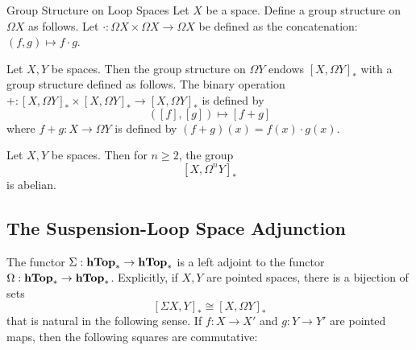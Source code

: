 \documentclass[a4paper]{article}
\begin{document}
\begin{defn}{Group Structure on Loop Spaces}{} Let $X$ be a space. Define a group structure on $\Omega X$ as follows. Let $\cdot:\Omega X\times\Omega X\to\Omega X$ be defined as the concatenation: $(f,g)\mapsto f\cdot g$. 
\end{defn}

\begin{prp}{}{} Let $X,Y$ be spaces. Then the group structure on $\Omega Y$ endows $[X,\Omega Y]_\ast$ with a group structure defined as follows. The binary operation $+:[X,\Omega Y]_\ast\times[X,\Omega Y]_\ast\to[X,\Omega Y]_\ast$ is defined by $$([f],[g])\mapsto[f+g]$$ where $f+g:X\to\Omega Y$ is defined by $(f+g)(x)=f(x)\cdot g(x)$. 
\end{prp}

\begin{prp}{}{} Let $X,Y$ be spaces. Then for $n\geq 2$, the group $$[X,\Omega^n Y]_\ast$$ is abelian. 
\end{prp}

\subsection{The Suspension-Loop Space Adjunction}
\begin{thm}{}{} The functor $\Sigma:\bold{hTop}_\ast\to\bold{hTop}_\ast$ is a left adjoint to the functor $\Omega:\bold{hTop}_\ast\to\bold{hTop}_\ast$. Explicitly, if $X,Y$ are pointed spaces, there is a bijection of sets $$[\Sigma X,Y]_\ast\cong[X,\Omega Y]_\ast$$ that is natural in the following sense. If $f:X\to X'$ and $g:Y\to Y'$ are pointed maps, then the following squares are commutative: \\~\\
\\~\\
\end{thm}
\end{document}
